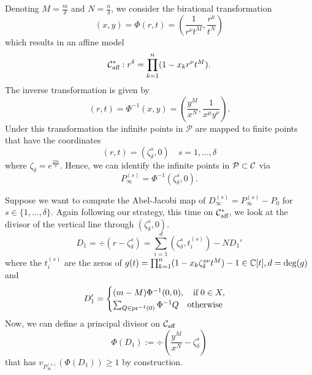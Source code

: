 \documentclass[main.tex]{subfiles}
\begin{document}
  Denoting $M = \frac{m}\delta$ and $N = \frac{n}\delta$, we consider the birational transformation
  \begin{equation}
   (x,y) = \Phi(r,t) = \left(\frac{1}{r^{\nu}t^M},\frac{r^{\mu}}{t^N}\right)
  \end{equation}
  which results in an affine model
  \begin{equation}
   \mathcal{C}_{\text{aff}}^{*} : r^{\delta} = \prod_{k=1}^n (1-x_kr^{\nu}t^M).
  \end{equation}
  The inverse transformation is given by
  \begin{equation}
   (r,t) = \Phi^{-1}(x,y) = \left(\frac{y^M}{x^N},\frac{1}{x^{\mu}y^{\nu}}\right).
  \end{equation}
  Under this transformation the infinite points in $\mathcal{P}$ are mapped to finite points that have the coordinates
  \begin{equation}
   (r,t) = (\zeta_{\delta}^s,0) \quad s= 1,\dots,\delta
  \end{equation}
  where $\zeta_{\delta} = e^{\frac{2\pi i }{\delta}}$. 
  Hence, we can identify the infinite points in $\mathcal{P} \subset \mathcal{C}$ via
   \begin{equation}
      P_{\infty}^{(s)} = \Phi^{-1}(\zeta_{\delta}^s,0).
   \end{equation}
   
   
   Suppose we want to compute the Abel-Jacobi map of $D_{\infty}^{(s)} = P_{\infty}^{(s)} - P_0$ for $s \in \{1,\dots,\delta\}$.
   Again following our strategy,
   this time on $\mathcal{C}_{\text{aff}}^{*}$, we look at the divisor of the vertical line through $(\zeta_{\delta}^s,0)$.
   \begin{equation}
      D_1 = \div(r - \zeta_{\delta}^s) = \sum_{i = 1}^{d} \left(\zeta_{\delta}^s,t_i^{(s)}\right) - N D_1'
   \end{equation}
      where the $t_i^{(s)}$ are the zeros of $g(t) = \prod_{k=1}^n (1-x_k\zeta_{\delta}^{s\nu}t^M) - 1 \in \mathbb{C}[t], d = \operatorname{deg}(g)$ and
    \begin{equation}
       D_1' = \begin{cases}
	     (m-M) \Phi^{-1}(0,0), \quad \text{if} \; 0 \in X, \\
             \sum_{Q \in \operatorname{pr}^{-1}(0)} \Phi^{-1}Q \quad \text{otherwise}
            \end{cases}
    \end{equation}
    Now, we can define a principal divisor on $\mathcal{C}_{\text{aff}}$ 
    \begin{equation}
       \Phi(D_1) := \div \left( \frac{y^M}{x^N} - \zeta_{\delta}^s \right)
    \end{equation}
   that has $v_{P_{\infty}^{(s)}}(\Phi(D_1)) \ge 1$ by construction.
    
\end{document}
